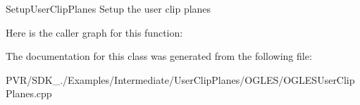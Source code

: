   Setup\+User\+Clip\+Planes  Setup the user clip planes 

Here is the caller graph for this function\+:




The documentation for this class was generated from the following file\+:\begin{DoxyCompactItemize}
\item 
P\+V\+R/\+S\+D\+K\+\_./\+Examples/\+Intermediate/\+User\+Clip\+Planes/\+O\+G\+L\+E\+S/O\+G\+L\+E\+S\+User\+Clip\+Planes.\+cpp\end{DoxyCompactItemize}
